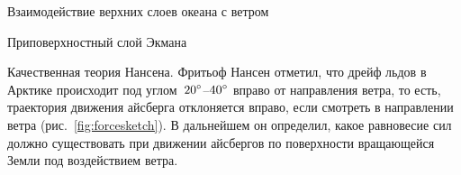 \begin{chapter}{Взаимодействие верхних слоев океана с ветром}
\begin{section}{Приповерхностный слой Экмана}

\begin{paragraph}{Качественная теория Нансена.}
Фритьоф Нансен отметил, что дрейф льдов в Арктике происходит под 
углом~${20}^\circ$--${40}^\circ$ вправо от направления ветра,
то есть, траектория движения айсберга отклоняется вправо, если смотреть
в направлении ветра (рис.~\ref{fig:forcesketch}). В дальнейшем он определил,
какое равновесие сил должно существовать при движении айсбергов
по поверхности вращающейся Земли под воздействием ветра.
%


\end{paragraph}
\end{section}
\end{chapter}
